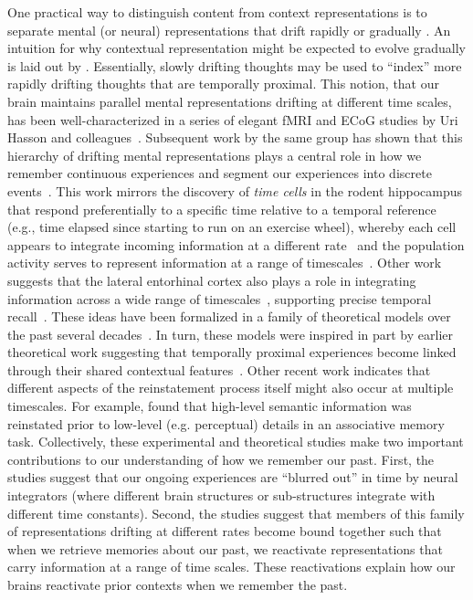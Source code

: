 \documentclass{article}
\begin{document}
One practical way to distinguish content from context representations is to separate mental (or neural) representations that drift rapidly \citep[content;][]{PolyEtal05, MannEtal12} or gradually \citep[context;][]{PolyEtal05, MannEtal11, HowaEtal12, LohnEtal18, LongKaha18, FolkEtal18}.  An intuition for why contextual representation might be expected to evolve gradually is laid out by \cite{PolyKaha08}.  Essentially, slowly drifting thoughts may be used to ``index'' more rapidly drifting thoughts that are temporally proximal.  This notion, that our brain maintains parallel mental representations drifting at different time scales, has been well-characterized in a series of elegant fMRI and ECoG studies by Uri Hasson and colleagues~\citep{HassEtal08, LernEtal11, HoneEtal12, AlyEtal18}.  Subsequent work by the same group has shown that this hierarchy of drifting mental representations plays a central role in how we remember continuous experiences and segment our experiences into discrete events~\citep{BaldEtal17}. This work mirrors the discovery of \textit{time cells} in the rodent hippocampus that respond preferentially to a specific time relative to a temporal reference (e.g., time elapsed since starting to run on an exercise wheel), whereby each cell appears to integrate incoming information at a different rate~\citep{PastEtal08, MacDEtal11} and the population activity serves to represent information at a range of timescales~\citep{MauEtal18}. Other work suggests that the lateral entorhinal cortex also plays a role in integrating information across a wide range of timescales~\citep{TsaoEtal18}, supporting precise temporal recall~\citep{MontEtal19}.  These ideas have been formalized in a family of theoretical models over the past several decades~\citep{HowaKaha02, DianEtal07, SedeEtal08, PolyEtal09, ShanEtal09, ShanHowa10, ShanHowa12, HowaEtal14, Rang18}.  In turn, these models were inspired in part by earlier theoretical work suggesting that temporally proximal experiences become linked through their shared contextual features~\citep{Este55a,AtkiShif68}.  Other recent work
indicates that different aspects of the reinstatement process itself might also occur at multiple timescales.  For example, \cite{LindEtal19} found that high-level semantic information was reinstated prior to low-level (e.g. perceptual) details in an associative memory task.  Collectively, these experimental and theoretical studies make two important contributions to our understanding of how we remember our past.  First, the studies suggest that our ongoing experiences are ``blurred out'' in time by neural integrators (where different brain structures or sub-structures integrate with different time constants).  Second, the studies suggest that members of this family of representations drifting at different rates become bound together such that when we retrieve memories about our past, we reactivate representations that carry information at a range of time scales.  These reactivations explain how our brains reactivate prior contexts when we remember the past.
\end{document}
